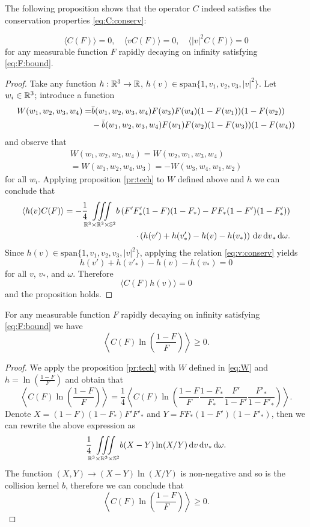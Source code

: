 The following proposition shows that the operator $C$ indeed satisfies the conservation properties \eqref{eq:C:conserv}:
\begin{proposition}
		\[	\langle C(F)\rangle=0,\quad \langle vC(F)\rangle=0,\quad\langle |v|^2C(F)\rangle=0 \]
		for any measurable function $F$ rapidly decaying on infinity satisfying \eqref{eq:F:bound}.
\end{proposition}
\begin{proof}
Take any function $h:{\mathbb {R}^3}\to{\mathbb {R}}$, $h(v)\in \mathrm{span}\{1,v_1,v_2,v_3,|v|^2\}$. Let $w_i\in {\mathbb {R}^3}$; introduce a function   \begin{align}
		W(w_1,w_2,w_3,w_4)  =&  \bar b(w_1,w_2,w_3,w_4) F(w_3)F(w_4)(1-F(w_1))(1-F(w_2))\notag\\&-\bar b(w_1,w_2,w_3,w_4)F(w_1)F(w_2)(1-F(w_3))(1-F(w_4))\label{eq:W}
\end{align}
and observe that
\[\begin{split}
	W(w_1,w_2,w_3,w_4)=W(w_2,w_1,w_3,w_4)\\=W(w_1,w_2,w_4,w_3)=-W(w_3,w_4,w_1,w_2)
\end{split}\] for all $w_i$. 
 Applying proposition \ref{pr:tech} to $W$  defined above and $h$ we can conclude that
 \[\begin{split}
 	\langle h(v)C(F)\rangle = -\frac 14  {\iiint\limits_{\mathbb R^3\times\mathbb R^3\times\mathbb S^2}} b\left(F'F'_\ast(1-F)(1-F_\ast)-FF_\ast(1-F')(1-F'_\ast)\right)\\\cdot\left( h(v')+h(v'_\ast)-h(v)-h(v_\ast)\right){\,\mathrm{d} v}{\,\mathrm{d} v}_\ast{\,\mathrm{d} \omega}.
 \end{split}\]
Since $h(v)\in \mathrm{span}\{1,v_1,v_2,v_3,|v|^2\}$, applying the relation \eqref{eq:v:conserv} yields 
\[h(v')+h(v'_\ast)-h(v)-h(v_\ast)=0\]
for all $v$, $v_\ast$, and $\omega$. Therefore
\[\langle C(F)h(v)\rangle=0\]and the proposition holds.
\end{proof}

\begin{proposition}
	For any measurable function $F$ rapidly decaying on infinity satisfying \eqref{eq:F:bound} we have 
	\begin{equation*} 
 \left\langle
C(F )\ln\left(\frac{1-F }{F}\right)\right\rangle \ge0.
\end{equation*}
\end{proposition}
\begin{proof}
	We apply the proposition \ref{pr:tech} with $W$ defined in \eqref{eq:W} and $h=\ln\left(\frac{1-F }{F}\right)$ and obtain that
	\[ \left\langle
C(F )\ln\left(\frac{1-F }{F}\right)\right\rangle
=\frac 14 \left\langle
C(F )\ln\left(\frac{1-F }{F}\frac{1-F_\ast }{F_\ast}\frac{F'}{1-F' }\frac{F'_\ast}{1-F'_\ast }\right)\right\rangle.
\]
Denote $X = (1-F )   (1-F_\ast)   F' F'_\ast $ and $Y = {F}  {F_\ast} {(1-F' )} {(1-F'_\ast )} $, then we can rewrite the above expression as
\[\frac 14{\iiint\limits_{\mathbb R^3\times\mathbb R^3\times\mathbb S^2}} b (X-Y)\ln(X/Y){\,\mathrm{d} v}{\,\mathrm{d} v}_\ast{\,\mathrm{d} \omega}.\]
The function $(X,Y)\to (X-Y)\ln(X/Y)$ is non-negative and so is the collision kernel $b$, therefore we can conclude that
	\begin{equation*} 
 \left\langle
C(F )\ln\left(\frac{1-F }{F}\right)\right\rangle \ge0.
\end{equation*}
\end{proof}

